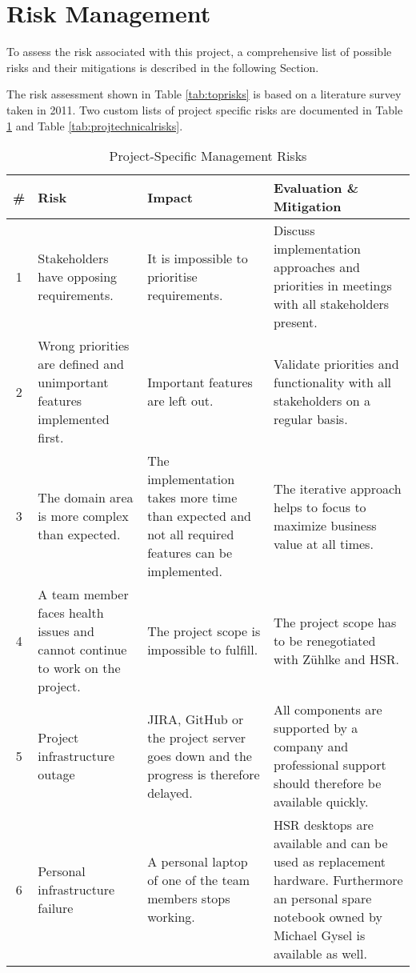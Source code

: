 \section{Risk Management}

To assess the risk associated with this project, a comprehensive list of possible risks and their mitigations is described in the following Section. 

The risk assessment shown in Table \ref{tab:toprisks} is based on a literature survey\cite{risk} taken in 2011. Two custom lists of project specific risks are documented in Table \ref{tab:projmgmtrisks} and Table \ref{tab:projtechnicalrisks}.

\begin{table}[H]
\begin{tabular}{|c|p{80pt} p{140pt} p{140pt}|}
\hline \# & Risk & Impact & Evaluation \& Mitigation \\ 
\hline 1 & Stakeholders have opposing requirements. & It is impossible to prioritise requirements. & Discuss implementation approaches and priorities in meetings with all stakeholders present. \\ 
2 & Wrong priorities are defined and unimportant features implemented first. & Important features are left out. & Validate priorities and functionality with all stakeholders on a regular basis. \\ 
3 & The domain area is more complex than expected. & The implementation takes more time than expected and not all required features can be implemented. & The iterative approach helps to focus to maximize business value at all times. \\ 
4 & A team member faces health issues and cannot continue to work on the project. & The project scope is impossible to fulfill. & The project scope has to be renegotiated with Z\"uhlke and HSR. \\ 
5 & Project infrastructure outage & JIRA, GitHub or the project server goes down and the progress is therefore delayed.  & All components are supported by a company and professional support should therefore be available quickly.  \\ 
6 & Personal infrastructure failure & A personal laptop of one of the team members stops working. & HSR desktops are available and can be used as replacement hardware. Furthermore an personal spare notebook owned by Michael Gysel is available as well.  \\ 
\hline
\end{tabular}
\caption{Project-Specific Management Risks}
\label{tab:projmgmtrisks}
\end{table}

